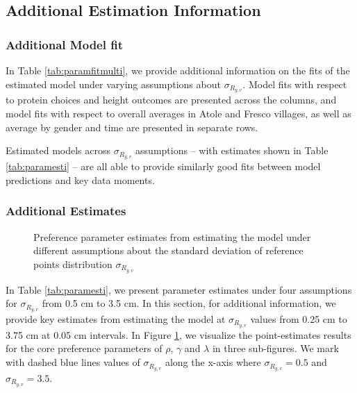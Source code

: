 \subsection{Additional Estimation Information \label{sec:estimorer}}

\subsubsection{Additional Model fit}


In Table \ref{tab:paramfitmulti}, we provide additional information on the fits of the estimated model under varying assumptions about $\sigma_{R_{y,v}}$. Model fits with respect to protein choices and height outcomes are presented across the columns, and model fits with respect to overall averages in Atole and Fresco villages, as well as average by gender and time are presented in separate rows.

Estimated models across $\sigma_{R_{y,v}}$ assumptions -- with estimates shown in Table \ref{tab:paramesti} -- are all able to provide similarly good fits between model predictions and key data moments.

\subsubsection{Additional Estimates}

\begin{figure}[htbp]
\caption{Preference parameter estimates from estimating the model under different assumptions about the standard deviation of reference points distribution $\sigma_{R_{y,v}}$}
\label{fig:estimatesmulti}
\end{figure}

In Table \ref{tab:paramesti}, we present parameter estimates under four assumptions for $\sigma_{R_{y,v}}$ from 0.5 cm to 3.5 cm. In this section, for additional information, we provide key estimates from estimating the model at $\sigma_{R_{y,v}}$ values from 0.25 cm to 3.75 cm at 0.05 cm intervals. In Figure \ref{fig:estimatesmulti}, we visualize the point-estimates results for the core preference parameters of $\rho$, $\gamma$ and $\lambda$ in three sub-figures. We mark with dashed blue lines values of $\sigma_{R_{y,v}}$ along the x-axis where $\sigma_{R_{y,v}}=0.5$ and $\sigma_{R_{y,v}}=3.5$.

